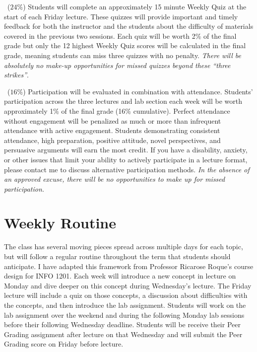 \documentclass[10pt]{memoir}
\begin{document}
\begin{description}[itemsep=0pt,labelsep=0pt]
        \item[Weekly Quizzes]~($24\%$) Students will complete an approximately 15 minute Weekly Quiz at the start of each Friday lecture. These quizzes will provide important and timely feedback for both the instructor and the students about the difficulty of materials covered in the previous two sessions. Each quiz will be worth 2\% of the final grade but only the 12 highest Weekly Quiz scores will be calculated in the final grade, meaning students can miss three quizzes with no penalty. \textit{There will be absolutely no make-up opportunities for missed quizzes beyond these ``three strikes''}.  %
        \item[Participation]~($16\%$) Participation will be evaluated in combination with attendance. Students' participation across the three lectures and lab section each week will be worth approximately 1\% of the final grade (16\% cumulative). Perfect attendance without engagement will be penalized as much or more than infrequent attendance with active engagement. Students demonstrating consistent attendance, high preparation, positive attitude, novel perspectives, and persuasive arguments will earn the most credit. If you have a disability, anxiety, or other issues that limit your ability to actively participate in a lecture format, please contact me to discuss alternative participation methods. \textit{In the absence of an approved excuse, there will be no opportunities to make up for missed participation.}
    \end{description}
    
\section{Weekly Routine}
The class has several moving pieces spread across multiple days for each topic, but will follow a regular routine throughout the term that students should anticipate. I have adapted this framework from Professor Ricarose Roque's course design for INFO 1201. Each week will introduce a new concept in lecture on Monday and dive deeper on this concept during Wednesday's lecture. The Friday lecture will include a quiz on those concepts, a discussion about difficulties with the concepts, and then introduce the lab assignment. Students will work on the lab assignment over the weekend and during the following Monday lab sessions before their following Wednesday deadline. Students will be receive their Peer Grading assignment after lecture on that Wednesday and will submit the Peer Grading score on Friday before lecture.
\end{document}
